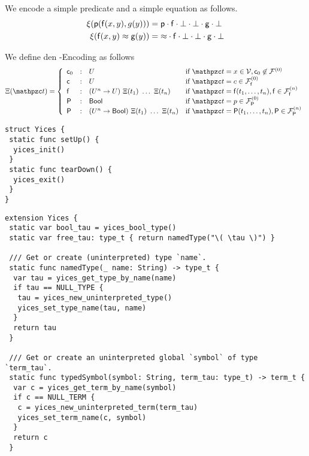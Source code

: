 \begin{example}
	We encode a simple predicate and a simple equation as follows.
	\begin{align*}
	\xi(\mathsf{p}(\mathsf{f}(x,y),g(y))) &= \mathsf{p}\cdot\mathsf{f}\cdot\bot\cdot\bot\cdot\mathsf{g}\cdot\bot
	\\
	\xi(\mathsf{f}(x,y)\approx \mathsf{g}(y)) &= {\approx}\cdot\mathsf{f}\cdot\bot\cdot\bot\cdot\mathsf{g}\cdot\bot
	\\
	\end{align*}
\end{example}

\begin{definition}
	We define den \SMT-Encoding as follows
\begin{gather*}
\MDEFINE{\Xi(\mct)}{lcll}{
	\mc_0&:&U &\text{if } \mct=x\in\mcV, \mc_0\not\in\mcFn[0]
	\\
	\mc&:&U &\text{if } \mct=c\in\mcFfn[0]
	\\
	\mf&:&(U^n\rightarrow U){\ }\Xi(t_1){\ }\ldots{\ }\Xi(t_n)
	&\text{if }\mct=\mf(t_1,\ldots,t_n), \mf\in\mcFfn{}
	\\
	\mP&:&\mathsf{Bool} &\text{if } \mct=p\in\mcFPn[0]
	\\
	\mP&:& (U^n \rightarrow\mathsf{Bool}){\ }\Xi(t_1){\ }\ldots{\ }\Xi(t_n)
	&\text{if }\mct=\mP(t_1,\ldots,t_n), \mP\in\mcFPn{}
}
\end{gather*}
\end{definition}

\begin{lstlisting}[language=FLEA]
struct Yices {
 static func setUp() {
  yices_init()
 }
 static func tearDown() {
  yices_exit()
 }
}
\end{lstlisting}

\begin{lstlisting}[language=FLEA]
extension Yices {
 static var bool_tau = yices_bool_type()
 static var free_tau: type_t { return namedType("\( \tau \)") }

 /// Get or create (uninterpreted) type `name`.
 static func namedType(_ name: String) -> type_t {
  var tau = yices_get_type_by_name(name)
  if tau == NULL_TYPE {
   tau = yices_new_uninterpreted_type()
   yices_set_type_name(tau, name)
  }
  return tau
 }

 /// Get or create an uninterpreted global `symbol` of type `term_tau`.
 static func typedSymbol(symbol: String, term_tau: type_t) -> term_t {
  var c = yices_get_term_by_name(symbol)
  if c == NULL_TERM {
   c = yices_new_uninterpreted_term(term_tau)
   yices_set_term_name(c, symbol)
  }
  return c
 }
\end{lstlisting}

